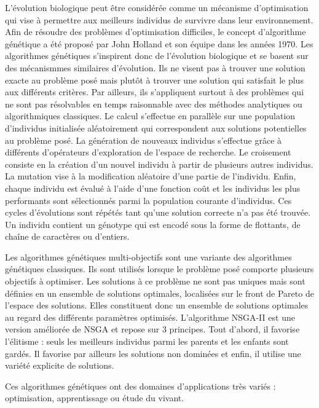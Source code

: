 \documentclass[draft]{llncs}
\begin{document}
L'évolution biologique peut être considérée comme un mécanisme d'optimisation qui vise à permettre aux meilleurs individus de survivre dans leur environnement.
Afin de résoudre des problèmes d'optimisation difficiles, le concept d'algorithme génétique a été proposé par John Holland et son équipe \cite{Holland:1975} dans les années 1970. 
Les algorithmes génétiques s'inspirent donc de l'évolution biologique et se basent sur des mécanismmes similaires d'évolution.
Ils ne visent pas à trouver une solution exacte au problème posé mais plutôt à trouver une solution qui satisfait le plus aux différents critères.
Par ailleurs, ils s'appliquent surtout à des problèmes qui ne sont pas résolvables en temps raisonnable avec des méthodes analytiques ou algorithmiques classiques.
Le calcul s'effectue en parallèle sur une population d’individus initialisée aléatoirement qui correspondent aux solutions potentielles au problème posé. 
La génération de nouveaux individus s'effectue grâce à différents d’opérateurs d’exploration de l'espace de recherche. 
Le croisement consiste en la création d’un nouvel individu à partir de plusieurs autres individus. 
La mutation vise à la modification aléatoire d’une partie de l’individu. 
Enfin, chaque individu est évalué à l'aide d'une fonction coût et les individus les plus performants sont sélectionnés parmi la population courante d'individus.
Ces cycles d'évolutions sont répétés tant qu'une solution correcte n'a pas été trouvée.
Un individu contient un génotype qui est encodé sous la forme de flottants, de chaîne de caractères ou d'entiers.


Les algorithmes génétiques multi-objectifs sont une variante des algorithmes génétiques classiques.
Ils sont utilisés lorsque le problème posé comporte plusieurs objectifs à optimiser.
Les solutions à ce problème ne sont pas uniques mais sont définies en un ensemble de solutions optimales, localisées sur le front de Pareto de l'espace des solutions.
Elles constituent donc un ensemble de solutions optimales au regard des différents paramètres optimisés.
L'algorithme NSGA-II\cite{Deb:2002:FEM:2221359.2221582} est une version améliorée de NSGA et repose sur 3 principes.
Tout d'abord, il favorise l'élitisme : seuls les meilleurs individus parmi les parents et les enfants sont gardés.
Il favorise par ailleurs les solutions non dominées et enfin, il utilise une variété explicite de solutions.

Ces algorithmes génétiques ont des domaines d'applications très variés : optimisation, apprentissage ou étude du vivant.
\end{document}
